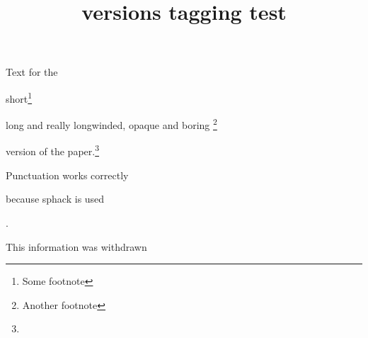 \documentclass{article}
\title{versions tagging test}
\begin{document}
Text for the
\begin{abridged}
short\footnote{Some footnote}%
\end{abridged}
\begin{unabridged}
long and really longwinded, opaque and boring%
\footnote{Another footnote}%
\end{unabridged}
version of the paper.\footnote{}

Punctuation works correctly\begin{unabridged}
because sphack is used\end{unabridged}.

\begin{redact}This information was withdrawn\end{redact}
\end{document}

